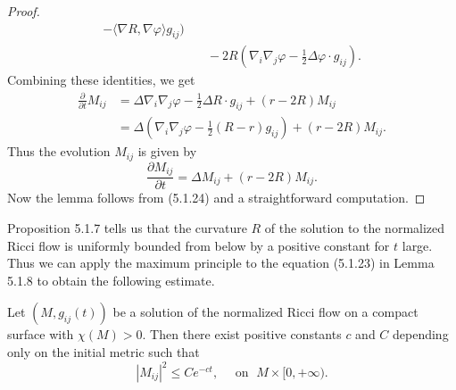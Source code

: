 \begin{proof}
\begin{displaymath}
\begin{split}
    -\langle\nabla R,\nabla \varphi\rangle g_{ij})\\
&\quad  -2R\left(\nabla_i\nabla_j\varphi-\frac{1}{2}\Delta\varphi\cdot
    g_{ij}\right).
\end{split}
\end{displaymath}
Combining these identities, we get
\begin{displaymath}
\begin{split}
\frac{\partial}{\partial t}M_{ij} & =
\Delta\nabla_i\nabla_j\varphi-\frac{1}{2}\Delta R\cdot g_{ij}
+(r-2R)M_{ij}\\
& = \Delta\left(\nabla_i\nabla_j\varphi-\frac{1}{2}(R-r)g_{ij}\right)
+(r-2R)M_{ij}.
\end{split}
\end{displaymath}
Thus the evolution $M_{ij}$ is given by \begin{equation} \frac{\partial
M_{ij}}{\partial t}=\Delta M_{ij}+(r-2R)M_{ij}.
\end{equation} Now the lemma follows from (5.1.24) and a straightforward
computation.
\end{proof}

Proposition 5.1.7 tells us that the curvature $R$ of the solution
to the normalized Ricci flow is uniformly bounded from below by a
positive constant for $t$ large. Thus we can apply the maximum
principle to the equation (5.1.23) in Lemma 5.1.8 to obtain the
following estimate.

\begin{proposition}  
  \label{prop:cz-tracefree-hessian-exponential-decay}

Let $(M,g_{ij}(t))$ be a solution of the normalized Ricci flow on
a compact surface with $\chi(M)>0$. Then there exist positive
constants $c$ and $C$ depending only on the initial metric such
that
$$
|M_{ij}|^2\leq Ce^{-ct},\quad \text{ on }\; M\times[0,+\infty).
$$
\end{proposition}

